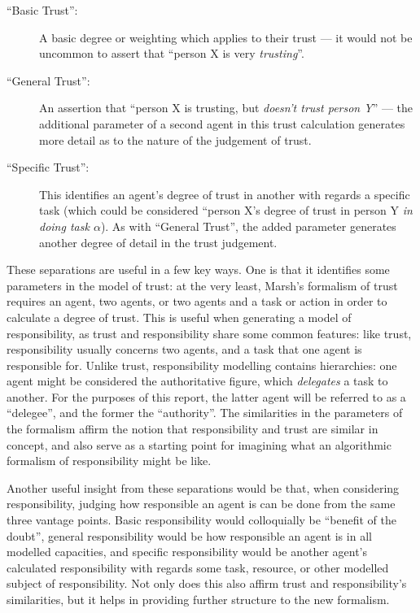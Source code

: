 \begin{description}
    \item [``Basic Trust'': ] A basic degree or weighting which applies to their trust --- it would not be uncommon to assert that ``person X is very \emph{trusting}''.
    \item [``General Trust'': ] An assertion that ``person X is trusting, but \emph{doesn't trust person Y}'' --- the additional parameter of a second agent in this trust calculation generates more detail as to the nature of the judgement of trust.
    \item [``Specific Trust'': ] This identifies an agent's degree of trust in another with regards a specific task (which could be considered ``person X's degree of trust in person Y \emph{in doing task \(\alpha\)}). As with ``General Trust'', the added parameter generates another degree of detail in the trust judgement.
\end{description}

These separations are useful in a few key ways. One is that it identifies some parameters in the model of trust: at the very least, Marsh's formalism of trust requires an agent, two agents, or two agents and a task or action in order to calculate a degree of trust. This is useful when generating a model of responsibility, as trust and responsibility share some common features: like trust, responsibility usually concerns two agents, and a task that one agent is responsible for. Unlike trust, responsibility modelling contains hierarchies: one agent might be considered the authoritative figure, which \emph{delegates} a task to another. For the purposes of this report, the latter agent will be referred to as a ``delegee'', and the former the ``authority''. The similarities in the parameters of the formalism affirm the notion that responsibility and trust are similar in concept, and also serve as a starting point for imagining what an algorithmic formalism of responsibility might be like.\par

Another useful insight from these separations would be that, when considering responsibility, judging how responsible an agent is can be done from the same three vantage points. Basic responsibility would colloquially be ``benefit of the doubt'', general responsibility would be how responsible an agent is in all modelled capacities, and specific responsibility would be another agent's calculated responsibility with regards some task, resource, or other modelled subject of responsibility. Not only does this also affirm trust and responsibility's similarities, but it helps in providing further structure to the new formalism.\par

